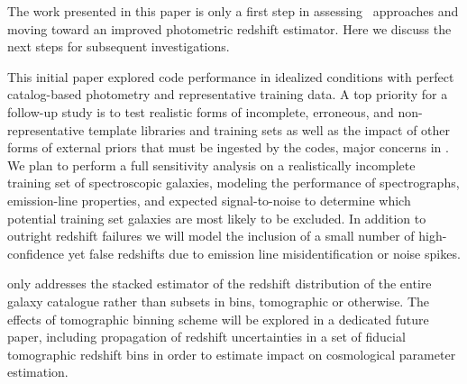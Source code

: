 
The work presented in this paper is only a first step in assessing \pzpdf\ approaches and moving toward an improved photometric redshift estimator.
Here we discuss the next steps for subsequent investigations.

This initial paper explored code performance in idealized conditions with perfect catalog-based photometry and representative training data.
A top priority for a follow-up study is to test realistic forms of incomplete, erroneous, and non-representative template libraries and training sets as well as the impact of other forms of external priors that must be ingested by the codes, major concerns in \citet{Newman:2015, Masters:2017}.
We plan to perform a full sensitivity analysis on a realistically incomplete training set of spectroscopic galaxies, modeling the performance of spectrographs, emission-line properties, and expected signal-to-noise to determine which potential training set galaxies are most likely to be excluded.
In addition to outright redshift failures we will model the inclusion of a small number of high-confidence yet false redshifts due to emission line misidentification or noise spikes.

 only addresses the stacked estimator of the redshift distribution of the entire galaxy catalogue rather than subsets in bins, tomographic or otherwise.
The effects of tomographic binning scheme will be explored in a dedicated future paper, including propagation of redshift uncertainties in a set of fiducial tomographic redshift bins in order to estimate impact on cosmological parameter estimation.


